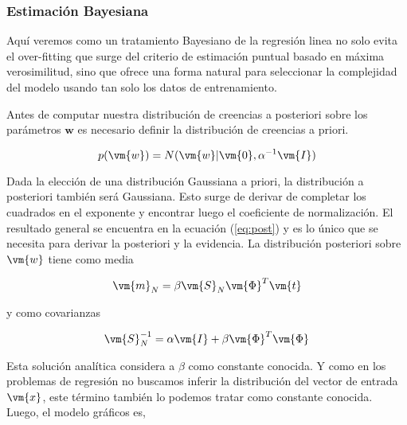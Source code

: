 \documentclass[a4paper,10pt]{article}
\begin{document}
\subsubsection{Estimaci\'on Bayesiana}

Aqu\'i veremos como un tratamiento Bayesiano de la regresi\'on linea no solo evita el over-fitting que surge del criterio de estimaci\'on puntual basado en m\'axima verosimilitud, sino que ofrece una forma natural para seleccionar la complejidad del modelo usando tan solo los datos de entrenamiento.

\vspace{0.3cm}

Antes de computar nuestra distribuci\'on de creencias a posteriori sobre los par\'ametros $\bm{w}$ es necesario definir la distribuci\'on de creencias a priori.

\begin{equation}
 p(\vm{w}) = N(\vm{w}| \vm{0}, \alpha^{-1} \vm{I})
\end{equation}

Dada la elecci\'on de una distribuci\'on Gaussiana a priori, la distribuci\'on a posteriori tambi\'en ser\'a Gaussiana.
Esto surge de derivar de completar los cuadrados en el exponente y encontrar luego el coeficiente de normalizaci\'on.
El resultado general se encuentra en la ecuaci\'on (\ref{eq:post}) y es lo \'unico que se necesita para derivar la posteriori y la evidencia.
La distribuci\'on posteriori sobre $\vm{w}$ tiene como media

\begin{equation}
 \vm{m}_N = \beta  \vm{S}_N\vm{\Phi}^T \vm{t}
\end{equation}

y como covarianzas

\begin{equation}
 \vm{S}_N^{-1} = \alpha \vm{I} + \beta \vm{\Phi}^T\vm{\Phi}
\end{equation}

Esta soluci\'on anal\'itica considera a $\beta$ como constante conocida.
Y como en los problemas de regresi\'on no buscamos inferir la distribuci\'on del vector de entrada $\vm{x}$, este t\'ermino tambi\'en lo podemos tratar como constante conocida.
Luego, el modelo gr\'aficos es, 

\begin{figure}[H]
    \centering
\end{figure}
\end{document}
